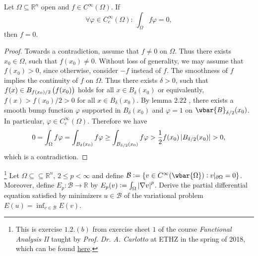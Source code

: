 \begin{lemma}
	\label{lem:fundamental_lemma}
	Let $\Omega \subseteq \mathbb{R}^n$ open and $f \in C^\infty(\Omega)$. If
	\begin{equation*}
		\forall \varphi \in C^\infty_c(\Omega): \> \int_\Omega f\varphi = 0,
	\end{equation*}
	\noindent then $f = 0$.
\end{lemma}

\begin{proof}
	Towards a contradiction, assume that $f \neq 0$ on $\Omega$. Thus there exists $x_0 \in \Omega$, such that $f(x_0) \neq 0$. Without loss of generality, we may assume that $f(x_0) > 0$, since otherwise, consider $-f$ instead of $f$.	The smoothness of $f$ implies the continuity of $f$ on $\Omega$. Thus there exists $\delta > 0$, such that $f(x) \in B_{f(x_0)/2}\del[1]{f(x_0)}$ holds for all $x \in B_\delta(x_0)$ or equivalently, $f(x) > f(x_0)/2 > 0$ for all $x \in B_\delta(x_0)$. By lemma $2.22$ \cite[42]{lee:smooth_manifolds:2013}, there exists a smooth bump function $\varphi$ supported in $B_\delta(x_0)$ and $\varphi = 1$ on $\wbar{B}_{\delta/2}(x_0)$. In particular, $\varphi \in C^\infty_c(\Omega)$. Therefore we have
	\begin{equation*}
		0 = \int_\Omega f \varphi = \int_{B_\delta(x_0)} f \varphi \geq \int_{B_{\delta/2}(x_0)} f \varphi > \frac{1}{2}f(x_0) \abs[0]{B_{\delta/2}(x_0)} > 0,
	\end{equation*}
	\noindent which is a contradiction.
\end{proof}

\begin{exercise}\footnote{This is exercise $1.2. (b)$ from exercise sheet $1$ of the course \emph{Functional Analysis II} taught by \emph{Prof. Dr. A. Carlotto} at ETHZ in the spring of 2018, which can be found \href{https://metaphor.ethz.ch/x/2018/fs/401-3462-00L/ex/Problems01-FAII.pdf}{here}.}
	Let $\Omega \subseteq \subseteq \mathbb{R}^n$, $2 \leq p < \infty$ and define $\mathcal{B} := \cbr[0]{v \in C^\infty(\wbar{\Omega}) : v\vert_{\partial\Omega} = 0}$. Moreover, define $E_p : \mathcal{B} \to \mathbb{R}$ by $E_p(v) := \int_\Omega \abs[0]{\nabla v}^p$. Derive the partial differential equation satisfied by minimizers $u \in \mathcal{B}$ of the variational problem $E(u) = \inf_{v \in \mathcal{B}}E(v)$.	
\end{exercise}
